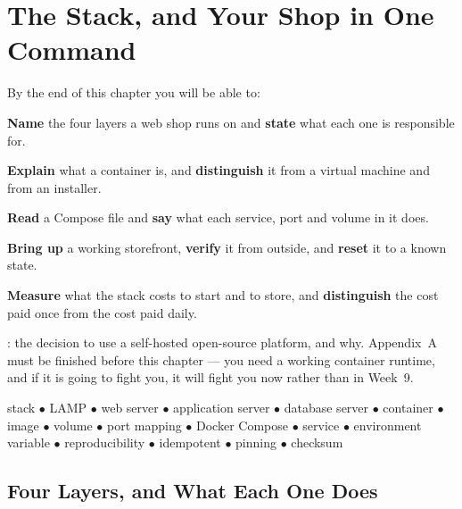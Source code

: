 \chapter{The Stack, and Your Shop in One Command}\label{ch:stack}

\begin{outcomes}
By the end of this chapter you will be able to:
\begin{tight}
  \item \textbf{Name} the four layers a web shop runs on and \textbf{state}
        what each one is responsible for.
  \item \textbf{Explain} what a container is, and \textbf{distinguish} it from
        a virtual machine and from an installer.
  \item \textbf{Read} a Compose file and \textbf{say} what each service, port
        and volume in it does.
  \item \textbf{Bring up} a working storefront, \textbf{verify} it from outside,
        and \textbf{reset} it to a known state.
  \item \textbf{Measure} what the stack costs to start and to store, and
        \textbf{distinguish} the cost paid once from the cost paid daily.
\end{tight}
\end{outcomes}

\begin{prereq}
: the decision to use a self-hosted open-source platform, and
why. Appendix~A must be finished before this chapter --- you need a working
container runtime, and if it is going to fight you, it will fight you now
rather than in Week~9.
\end{prereq}

\begin{keyterms}
stack $\bullet$ LAMP $\bullet$ web server $\bullet$ application server
$\bullet$ database server $\bullet$ container $\bullet$ image $\bullet$ volume
$\bullet$ port mapping $\bullet$ Docker Compose $\bullet$ service $\bullet$
environment variable $\bullet$ reproducibility $\bullet$ idempotent
$\bullet$ pinning $\bullet$ checksum
\end{keyterms}

\section{Four Layers, and What Each One Does}

